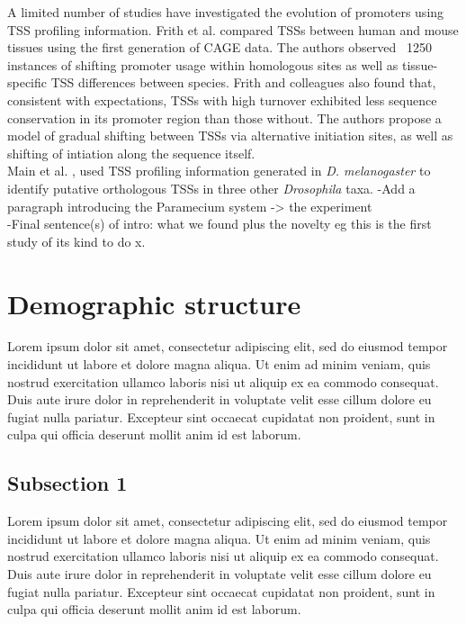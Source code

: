 \documentclass[nogrid]{MBE}%
\begin{document}
A limited number of studies have investigated the evolution of promoters using TSS profiling information. Frith et al. \citep{Frith:2006bb} compared TSSs between human and mouse tissues using the first generation of CAGE data. The authors observed ~1250 instances of shifting promoter usage within homologous sites as well as tissue-specific TSS differences between species. Frith and colleagues also found that, consistent with expectations, TSSs with high turnover exhibited less sequence conservation in its promoter region than those without. The authors propose a model of gradual shifting between TSSs via alternative initiation sites, as well as shifting of intiation along the sequence itself. \\
Main et al. \citep{Main:2013dg}, used TSS profiling information generated in \textit{D. melanogaster} to identify putative orthologous TSSs in three other \textit{Drosophila} taxa.
-Add a paragraph introducing the Paramecium system -> the experiment\\
-Final sentence(s) of intro: what we found plus the novelty eg this is the first study of its kind to do x.

\section{Demographic structure}

Lorem ipsum dolor sit amet, consectetur adipiscing elit, sed do eiusmod tempor incididunt ut labore et dolore magna aliqua. Ut enim ad minim veniam, quis nostrud exercitation ullamco laboris nisi ut aliquip ex ea commodo consequat. Duis aute irure dolor in reprehenderit in voluptate velit esse cillum dolore eu fugiat nulla pariatur. Excepteur sint occaecat cupidatat non proident, sunt in culpa qui officia deserunt mollit anim id est laborum.

\subsection{Subsection 1}

Lorem ipsum dolor sit amet, consectetur adipiscing elit, sed do eiusmod tempor incididunt ut labore et dolore magna aliqua. Ut enim ad minim veniam, quis nostrud exercitation ullamco laboris nisi ut aliquip ex ea commodo consequat. Duis aute irure dolor in reprehenderit in voluptate velit esse cillum dolore eu fugiat nulla pariatur. Excepteur sint occaecat cupidatat non proident, sunt in culpa qui officia deserunt mollit anim id est laborum.
\end{document}

